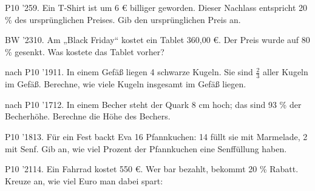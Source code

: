 \documentclass[11pt]{article}
\begin{document}
\par\addvspace{4pt}\Needspace*{0.3\textheight}\begin{list}{}{\setlength{\leftmargin}{8mm}\setlength{\topsep}{0pt}}\item[]
\par
\begin{pfaufg}{P10 ’25}{9.}{}
Ein T-Shirt ist um 6 € billiger geworden. Dieser Nachlass entspricht 20 \% des ursprünglichen Preises. Gib den ursprünglichen Preis an.\par\vspace{7mm}\noindent{\color{black!45}\rule{\linewidth}{0.4pt}}
\end{pfaufg}
\end{list}
\pfgruppe{}
\begin{pfaufg}{BW ’23}{10.}{}
Am „Black Friday“ kostet ein Tablet 360,00 €. Der Preis wurde auf 80 \% gesenkt. Was kostete das Tablet vorher?
\end{pfaufg}
\pfgruppe{}
\begin{pfaufg}{nach P10 ’19}{11.}{}
In einem Gefäß liegen 4 schwarze Kugeln. Sie sind $\tfrac{2}{3}$ aller Kugeln im Gefäß. Berechne, wie viele Kugeln insgesamt im Gefäß liegen.
\end{pfaufg}
\pfgruppe{}
\begin{pfaufg}{nach P10 ’17}{12.}{}
In einem Becher steht der Quark 8 cm hoch; das sind 93 \% der Becherhöhe. Berechne die Höhe des Bechers.
\end{pfaufg}
\begin{pfaufg}{P10 ’18}{13.}{}
Für ein Fest backt Eva 16 Pfannkuchen: 14 füllt sie mit Marmelade, 2 mit Senf. Gib an, wie viel Prozent der Pfannkuchen eine Senffüllung haben.
\end{pfaufg}
\begin{pfaufg}{P10 ’21}{14.}{}
Ein Fahrrad kostet 550 €. Wer bar bezahlt, bekommt 20 \% Rabatt. Kreuze an, wie viel Euro man dabei spart:
\end{pfaufg}
\end{document}
